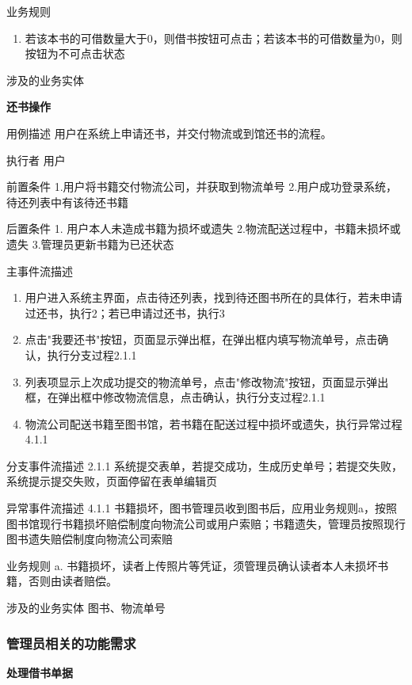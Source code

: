     业务规则      \begin{enumerate}[label=\alph*]
        \item  若该本书的可借数量大于0，则借书按钮可点击；若该本书的可借数量为0，则按钮为不可点击状态     
    \end{enumerate} 

    涉及的业务实体  ~ 

\textbf{还书操作}

    用例描述     用户在系统上申请还书，并交付物流或到馆还书的流程。

    执行者      用户

    前置条件     1.用户将书籍交付物流公司，并获取到物流单号    2.用户成功登录系统，待还列表中有该待还书籍

    后置条件     1. 用户本人未造成书籍为损坏或遗失     2.物流配送过程中，书籍未损坏或遗失  3.管理员更新书籍为已还状态

    主事件流描述   \begin{enumerate} 
            \item 用户进入系统主界面，点击待还列表，找到待还图书所在的具体行，若未申请过还书，执行2；若已申请过还书，执行3
            \item 点击"我要还书"按钮，页面显示弹出框，在弹出框内填写物流单号，点击确认，执行分支过程2.1.1
            \item 列表项显示上次成功提交的物流单号，点击"修改物流"按钮，页面显示弹出框，在弹出框中修改物流信息，点击确认，执行分支过程2.1.1
            \item 物流公司配送书籍至图书馆，若书籍在配送过程中损坏或遗失，执行异常过程4.1.1
        \end{enumerate}

    分支事件流描述  2.1.1 系统提交表单，若提交成功，生成历史单号；若提交失败，系统提示提交失败，页面停留在表单编辑页     
    
    异常事件流描述  4.1.1 书籍损坏，图书管理员收到图书后，应用业务规则a，按照图书馆现行书籍损坏赔偿制度向物流公司或用户索赔；书籍遗失，管理员按照现行图书遗失赔偿制度向物流公司索赔                                                                               
    
    业务规则      a. 书籍损坏，读者上传照片等凭证，须管理员确认读者本人未损坏书籍，否则由读者赔偿。  
    
    涉及的业务实体  图书、物流单号     
\subsubsection{管理员相关的功能需求}
\textbf{处理借书单据}

